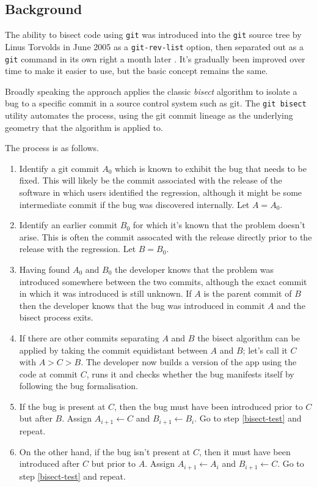\documentclass[pdflatex, sn-mathphys, referee]{sn-jnl}%
\theoremstyle{thmstyleone}%
\theoremstyle{thmstyletwo}%
\theoremstyle{thmstylethree}%
\def\code{\tt}
\theoremstyle{thmstyleone}
\begin{document}
\subsection{Background}

The ability to bisect code using {\code git} was introduced into the {\code git} source tree by Linus Torvolds in June 2005 \cite{git-commit-8b3a1e056f21} as a {\code git-rev-list} option, then separated out as a {\code git} command in its own right a month later \cite{git-commit-8cc6a0831988}. It's gradually been improved over time to make it easier to use, but the basic concept remains the same.

Broadly speaking the approach applies the classic {\it bisect\/} algorithm to isolate a bug to a specific commit in a source control system such as git. The {\tt git bisect} utility automates the process, using the git commit lineage as the underlying geometry that the algorithm is applied to.

The process is as follows.

\begin{enumerate}
\item \label{bisect-min} Identify a git commit $A_0$ which is known to exhibit the bug that needs to be fixed. This will likely be the commit associated with the release of the software in which users identified the regression, although it might be some intermediate commit if the bug was discovered internally. Let $A = A_0$.
\item \label{bisect-max} Identify an earlier commit $B_0$ for which it's known that the problem doesn't arise. This is often the commit assocated with the release directly prior to the release with the regression. Let $B = B_0$.
\item \label{bisect-test} Having found $A_0$ and $B_0$ the developer knows that the problem was introduced somewhere between the two commits, although the exact commit in which it was introduced is still unknown. If $A$ is the parent commit of $B$ then the developer knows that the bug was introduced in commit $A$ and the bisect process exits.
\item If there are other commits separating $A$ and $B$ the bisect algorithm can be applied by taking the commit equidistant between $A$ and $B$; let's call it $C$ with $A > C > B$. The developer now builds a version of the app using the code at commit $C$, runs it and checks whether the bug manifests itself by following the bug formalisation.
\item If the bug is present at $C$, then the bug must have been introduced prior to $C$ but after $B$. Assign $A_{i + 1} \leftarrow C$ and $B_{i + 1} \leftarrow B_i$. Go to step \ref{bisect-test} and repeat.
\item On the other hand, if the bug isn't present at $C$, then it must have been introduced after $C$ but prior to $A$. Assign $A_{i + 1} \leftarrow A_i$ and $B_{i + 1} \leftarrow C$. Go to step \ref{bisect-test} and repeat.
\end{enumerate}
\end{document}
